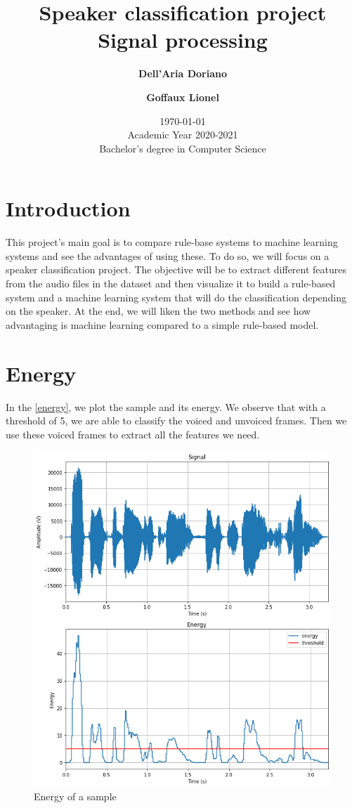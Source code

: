 \documentclass[]{article}
\title{
{\Huge Speaker classification project}\\
Signal processing\\
}
\author{
\textbf{Dell’Aria Doriano}
\and
\textbf{Goffaux Lionel}\\
}
\date{\today\\
Academic Year 2020-2021\\
Bachelor's degree in Computer Science\\}
\begin{document}
\maketitle
\pagebreak


\section{Introduction}
This project's main goal is to compare rule-base systems to machine learning systems and see
the advantages of using these. To do so, we will focus on a speaker classification project.
The objective will be to extract different features from the audio files in the dataset and
then visualize it to build a rule-based system and a machine learning system that will do
the classification depending on the speaker. At the end, we will liken the two methods
and see how advantaging is machine learning compared to a simple rule-based model.

\section{Energy}
In the \autoref{energy}, we plot the sample and its energy. We observe that with a threshold of 5,
we are able to classify the voiced and unvoiced frames.
Then we use these voiced frames to extract all the features we need.


\begin{figure}[H]
    \centering
    \caption{\label{energy}Energy of a sample}
    \includegraphics[scale=0.5]{images/energy_threshold.png}
\end{figure}
\end{document}
